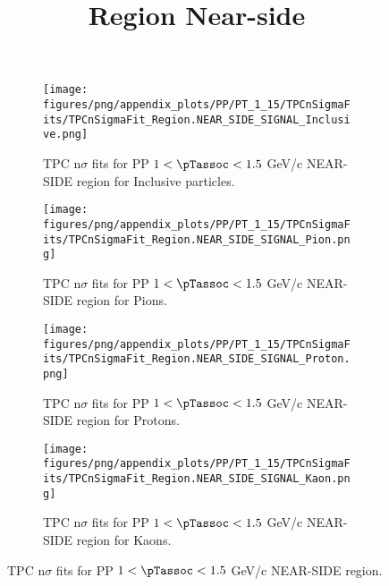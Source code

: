             \begin{figure}[H]
                \title{Region Near-side}
                \begin{subfigure}[b]{0.5\textwidth}
                    \centering
                    \texttt{[image: figures/png/appendix\_plots/PP/PT\_1\_15/TPCnSigmaFits/TPCnSigmaFit\_Region.NEAR\_SIDE\_SIGNAL\_Inclusive.png]}
                    \caption{TPC n$\sigma$ fits for PP $1 < \pTassoc < 1.5$ GeV/c NEAR-SIDE region for Inclusive particles.}
                    \label{fig:appendix_PP_$1 < \pTassoc < 1.5$ GeV/c_NEAR_SIDE_SIGNAL_Inclusive}
                \end{subfigure}
                \begin{subfigure}[b]{0.5\textwidth}
                    \centering
                    \texttt{[image: figures/png/appendix\_plots/PP/PT\_1\_15/TPCnSigmaFits/TPCnSigmaFit\_Region.NEAR\_SIDE\_SIGNAL\_Pion.png]}
                    \caption{TPC n$\sigma$ fits for PP $1 < \pTassoc < 1.5$ GeV/c NEAR-SIDE region for Pions.}
                    \label{fig:appendix_PP_$1 < \pTassoc < 1.5$ GeV/c_NEAR_SIDE_SIGNAL_Pion}
                \end{subfigure}
                \begin{subfigure}[b]{0.5\textwidth}
                    \centering
                    \texttt{[image: figures/png/appendix\_plots/PP/PT\_1\_15/TPCnSigmaFits/TPCnSigmaFit\_Region.NEAR\_SIDE\_SIGNAL\_Proton.png]}
                    \caption{TPC n$\sigma$ fits for PP $1 < \pTassoc < 1.5$ GeV/c NEAR-SIDE region for Protons.}
                    \label{fig:appendix_PP_$1 < \pTassoc < 1.5$ GeV/c_NEAR_SIDE_SIGNAL_Proton}
                \end{subfigure}
                \begin{subfigure}[b]{0.5\textwidth}
                    \centering
                    \texttt{[image: figures/png/appendix\_plots/PP/PT\_1\_15/TPCnSigmaFits/TPCnSigmaFit\_Region.NEAR\_SIDE\_SIGNAL\_Kaon.png]}
                    \caption{TPC n$\sigma$ fits for PP $1 < \pTassoc < 1.5$ GeV/c NEAR-SIDE region for Kaons.}
                    \label{fig:appendix_PP_$1 < \pTassoc < 1.5$ GeV/c_NEAR_SIDE_SIGNAL_Kaon}
                \end{subfigure}
                \caption{TPC n$\sigma$ fits for PP $1 < \pTassoc < 1.5$ GeV/c NEAR-SIDE region.}
                \label{fig:appendix_PP_$1 < \pTassoc < 1.5$ GeV/c_NEAR_SIDE_SIGNAL}
            \end{figure}
